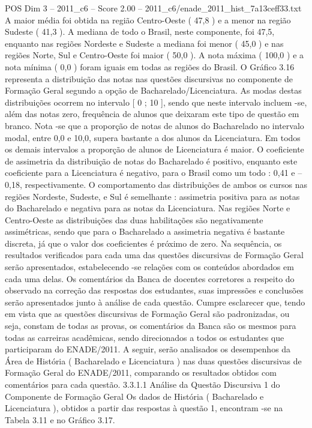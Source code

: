 \begin{textsample}{POS Dim 3 – 2011\_c6 – Score 2.00 – 2011\_c6/enade\_2011\_hist\_7a13ceff33.txt}
A maior média foi obtida na região Centro-Oeste ( 47,8 ) e a menor na região Sudeste ( 41,3 ).
A mediana de todo o Brasil, neste componente, foi 47,5, enquanto nas regiões Nordeste e Sudeste a mediana foi menor ( 45,0 ) e nas regiões Norte, Sul e Centro-Oeste foi maior ( 50,0 ).
A nota máxima ( 100,0 ) e a nota mínima ( 0,0 ) foram iguais em todas as regiões do Brasil.
O Gráfico 3.16 representa a distribuição das notas nas questões discursivas no componente de Formação Geral segundo a opção de Bacharelado/Licenciatura.
As modas destas distribuições ocorrem no intervalo [ 0 ; 10 ], sendo que neste intervalo incluem -se, além das notas zero, frequência de alunos que deixaram este tipo de questão em branco.
Nota -se que a proporção de notas de alunos do Bacharelado no intervalo modal, entre 0,0 e 10,0, supera bastante a dos alunos da Licenciatura.
Em todos os demais intervalos a proporção de alunos de Licenciatura é maior.
O coeficiente de assimetria da distribuição de notas do Bacharelado é positivo, enquanto este coeficiente para a Licenciatura é negativo, para o Brasil como um todo : 0,41 e – 0,18, respectivamente.
O comportamento das distribuições de ambos os cursos nas regiões Nordeste, Sudeste, e Sul é semelhante : assimetria positiva para as notas do Bacharelado e negativa para as notas da Licenciatura.
Nas regiões Norte e Centro-Oeste as distribuições das duas habilitações são negativamente assimétricas, sendo que para o Bacharelado a assimetria negativa é bastante discreta, já que o valor dos coeficientes é próximo de zero.
Na sequência, os resultados verificados para cada uma das questões discursivas de Formação Geral serão apresentados, estabelecendo -se relações com os conteúdos abordados em cada uma delas.
Os comentários da Banca de docentes corretores a respeito do observado na correção das respostas dos estudantes, suas impressões e conclusões serão apresentados junto à análise de cada questão.
Cumpre esclarecer que, tendo em vista que as questões discursivas de Formação Geral são padronizadas, ou seja, constam de todas as provas, os comentários da Banca são os mesmos para todas as carreiras acadêmicas, sendo direcionados a todos os estudantes que participaram do ENADE/2011.
A seguir, serão analisados os desempenhos da Área de História ( Bacharelado e Licenciatura ) nas duas questões discursivas de Formação Geral do ENADE/2011, comparando os resultados obtidos com comentários para cada questão. 3.3.1.1 Análise da Questão Discursiva 1 do Componente de Formação Geral Os dados de História ( Bacharelado e Licenciatura ), obtidos a partir das respostas à questão 1, encontram -se na Tabela 3.11 e no Gráfico 3.17.

\end{textsample}
